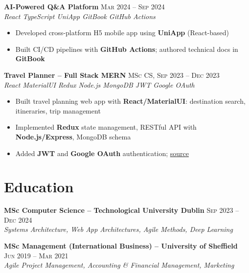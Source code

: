 \documentclass{simpleresume}
\begin{document}
\vspace{0.04cm}
\noindent\textbf{AI-Powered Q\&A Platform} \hfill{\sffamily\scshape\small\color{muted}Mar 2024 -- Sep 2024}\\
{\itshape\color{accent}\footnotesize React \quad\textbullet\quad TypeScript \quad\textbullet\quad UniApp \quad\textbullet\quad GitBook \quad\textbullet\quad GitHub Actions}
\vspace{-0.35mm}
\begin{itemize}
  \item Developed cross-platform H5 mobile app using \textbf{UniApp} (React-based)
  \item Built CI/CD pipelines with \textbf{GitHub Actions}; authored technical docs in \textbf{GitBook}
\end{itemize}

\vspace{0.04cm}
\noindent\textbf{Travel Planner -- Full Stack MERN} \hfill{\sffamily\scshape\small\color{muted}MSc CS, Sep 2023 -- Dec 2023}\\
{\itshape\color{accent}\footnotesize React \quad\textbullet\quad MaterialUI \quad\textbullet\quad Redux \quad\textbullet\quad Node.js \quad\textbullet\quad MongoDB \quad\textbullet\quad JWT \quad\textbullet\quad Google OAuth}
\vspace{-0.35mm}
\begin{itemize}
  \item Built travel planning web app with \textbf{React/MaterialUI}: destination search, itineraries, trip management
  \item Implemented \textbf{Redux} state management, RESTful API with \textbf{Node.js/Express}, MongoDB schema
  \item Added \textbf{JWT} and \textbf{Google OAuth} authentication; \href{https://github.com/Stevendu666/Web-App-Travel}{source}
\end{itemize}

\section{Education}
\noindent\textbf{MSc Computer Science -- Technological University Dublin}
  \hfill{\sffamily\scshape\small\color{muted}Sep 2023 -- Dec 2024}\\
  {\itshape\color{secondary}Systems Architecture, Web App Architectures, Agile Methods, Deep Learning}

\vspace{0.04cm}
\noindent\textbf{MSc Management (International Business) -- University of Sheffield}
  \hfill{\sffamily\scshape\small\color{muted}Jun 2019 -- Mar 2021}\\
  {\itshape\color{secondary}Agile Project Management, Accounting \& Financial Management, Marketing}
\end{document}
